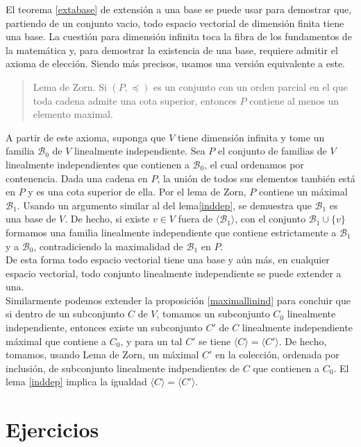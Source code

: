 \begin{obs}\label{basesinfty}
El teorema \ref{extabase} de extensión a una base se puede usar para demostrar que, partiendo de un conjunto vacio, todo espacio vectorial de dimensi\'on finita tiene una base. La cuesti\'on para dimensi\'on infinita toca la fibra de los fundamentos de la matem\'atica y, para demostrar la existencia de una base, requiere admitir el axioma de elecci\'on. Siendo m\'as precisos, usamos una versi\'on equivalente a este.
\begin{quote}
Lema de Zorn. Si $(P,\preccurlyeq)$ es un conjunto con un orden parcial en el que toda cadena admite una cota superior, entonces $P$ contiene al menos un elemento maximal.
\end{quote}
A partir de este axioma, suponga que $V$ tiene dimensi\'on infinita y tome un familia $\mathcal{B}_0$ de $V$ linealmente independiente. Sea $P$ el conjunto de familias de $V$ linealmente independientes que contienen a $\mathcal{B}_0$, el cual ordenamos por contenencia. Dada una cadena en $P$, la uni\'on de todos sus elementos tambi\'en est\'a en $P$ y es una cota superior de ella. Por el lema de Zorn, $P$ contiene un m\'aximal $\mathcal{B}_1$. Usando un argumento similar al del lema\ref{inddep}, se demuestra que $\mathcal{B}_1$ es una base de $V$. De hecho, si existe $v\in V$ fuera de $\langle \mathcal{B}_1\rangle$, con el conjunto $\mathcal{B}_1\cup\{v\}$ formamos una familia linealmente independiente que contiene estrictamente a $\mathcal{B}_1$ y a $\mathcal{B}_0$, contradiciendo la maximalidad de $\mathcal{B}_1$ en $P$.\\
De esta forma todo espacio vectorial tiene una base y a\'un m\'as, en cualquier espacio vectorial, todo conjunto linealmente independiente se puede extender a una.\\
Similarmente podemos extender la proposici\'on \ref{maximallinind} para concluir que si dentro de un subconjunto $C$ de $V$, tomamos un subconjunto $C_0$ linealmente independiente, entonces existe un subconjunto $C'$ de $C$ linealmente independiente m\'aximal que contiene a $C_0$, y para un tal $C'$ se tiene $\langle C\rangle=\langle C'\rangle$. De hecho, tomamos, usando Lema de Zorn, un m\'aximal $C'$ en la colecci\'on, ordenada por inclusi\'on, de subconjunto linealmente indpendientes de $C$ que contienen a $C_0$. El lema \ref{inddep} implica la igualdad $\langle C\rangle=\langle C'\rangle$.
\end{obs}

\section*{Ejercicios}

